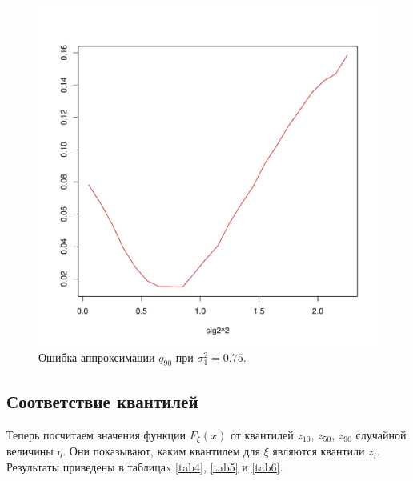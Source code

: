 \documentclass[specialist, substylefile = spbu.rtx,
subf,href,colorlinks=true, 12pt]{disser}
\begin{document}
\begin{figure}[!hhh]
	\begin{center}
		\begin{minipage}[h]{0.8\linewidth}
			\includegraphics[width=1\linewidth]{img_new/ris43.pdf}
			\caption{Ошибка аппроксимации $q_{90}$ при $\sigma_{1}^{2} = 0.75$.} %
			\label{ris4_3} %
		\end{minipage}	
	\end{center}
\end{figure}

\subsection{Соответствие квантилей}

Теперь посчитаем значения функции $F_{\xi}(x)$ от квантилей $z_{10}$, $z_{50}$, $z_{90}$ случайной величины $\eta$. Они показывают, каким квантилем для $\xi$ являются квантили $z_{i}$. Результаты приведены в таблицаx \ref{tab4}, \ref{tab5} и \ref{tab6}.
\end{document}
